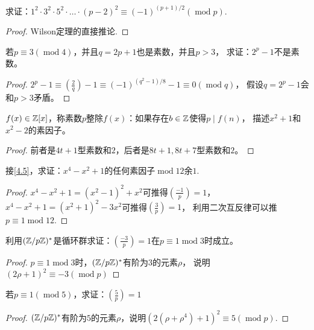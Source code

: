 \begin{exercise}
    求证：$1^2\cdot3^2\cdot5^2\cdot\ldots\cdot(p-2)^2\equiv (-1)^{(p+1)/2}(\operatorname{mod}p)$.
\end{exercise}
\begin{proof}
    Wilson定理的直接推论.
\end{proof}

\begin{exercise}
    若$p\equiv 3(\operatorname{mod}4)$，并且$q=2p+1$也是素数，并且$p>3$，
    求证：$2^p-1$不是素数。
\end{exercise}
\begin{proof}
    $2^p-1\equiv\left( \frac{2}{q} \right)-1\equiv(-1)^{(q^2-1)/8}-1\equiv0(\operatorname{mod}q)$，
    假设$q=2^p-1$会和$p>3$矛盾。
\end{proof}

\begin{exercise}\label{4.5}
    $f(x)\in\mathbb{Z}[x]$，称素数$p$整除$f(x)$：如果存在$b\in\mathbb{Z}$使得$p\mid f(n)$，
    描述$x^2+1$和$x^2-2$的素因子。
\end{exercise}
\begin{proof}
    前者是$4t+1$型素数和$2$，后者是$8t+1,8t+7$型素数和$2$。
\end{proof}

\begin{exercise}
    接\ref{4.5}，求证：$x^4-x^2+1$的任何素因子$\operatorname{mod}12$余$1$.
\end{exercise}
\begin{proof}
    $x^4-x^2+1=(x^2-1)^2+x^2$可推得$\left( \frac{-1}{p} \right)=1$，
    $x^4-x^2+1=(x^2+1)^2-3x^2$可推得$\left( \frac{3}{p} \right)=1$，
    利用二次互反律可以推$p\equiv1\operatorname{mod}12$.
\end{proof}

\begin{exercise}
    利用$(\mathbb{Z}/p\mathbb{Z})^*$是循环群求证：$\left( \frac{-3}{p} \right)=1$在$p\equiv1\operatorname{mod}3$时成立。
\end{exercise}
\begin{proof}
    $p\equiv1\operatorname{mod}3$时，$(\mathbb{Z}/p\mathbb{Z})^*$有阶为$3$的元素$\rho$，
    说明$(2\rho+1)^2\equiv-3(\operatorname{mod}p)$
\end{proof}

\begin{exercise}
若$p\equiv1(\operatorname{mod}5)$，求证：$\left( \frac{5}{p} \right)=1$
\end{exercise}
\begin{proof}
    $(\mathbb{Z}/p\mathbb{Z})^*$有阶为$5$的元素$\rho$，说明$(2(\rho+\rho^4)+1)^2\equiv5(\operatorname{mod}p)$.
\end{proof}

